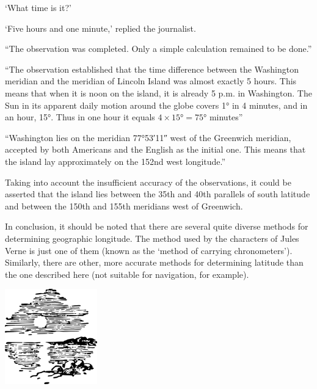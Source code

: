 `What time is it?'

`Five hours and one minute,' replied the journalist.

``The observation was completed. Only a simple calculation remained to be done.''

``The observation established that the time difference between the Washington meridian and the meridian of Lincoln Island was almost exactly 5 hours. This means that when it is noon on the island, it is already 5 p.m. in Washington. The Sun in its apparent daily motion around the globe covers \ang{1} in 4 minutes, and in an hour, \ang{15}. Thus in one hour it equals $4 \times \ang{15} = \ang{75}$ minutes''

``Washington lies on the meridian \ang{77;53;11} west of the Greenwich meridian, accepted by both Americans and the English as the initial one. This means that the island lay approximately on the 152nd west longitude.''

Taking into account the insufficient accuracy of the observations, it could be asserted that the island lies between the 35th and 40th parallels of south latitude and between the 150th and 155th meridians west of Greenwich.

In conclusion, it should be noted that there are several quite diverse methods for determining geographic longitude. The method used by the characters of Jules Verne is just one of them (known as the `method of carrying chronometers'). Similarly, there are other, more accurate methods for determining latitude than the one described here (not suitable for navigation, for example).


\begin{center}
\includegraphics[width=0.3\textwidth]{figures/ch-07/fig-ch-07-tail.pdf}
\end{center}



















